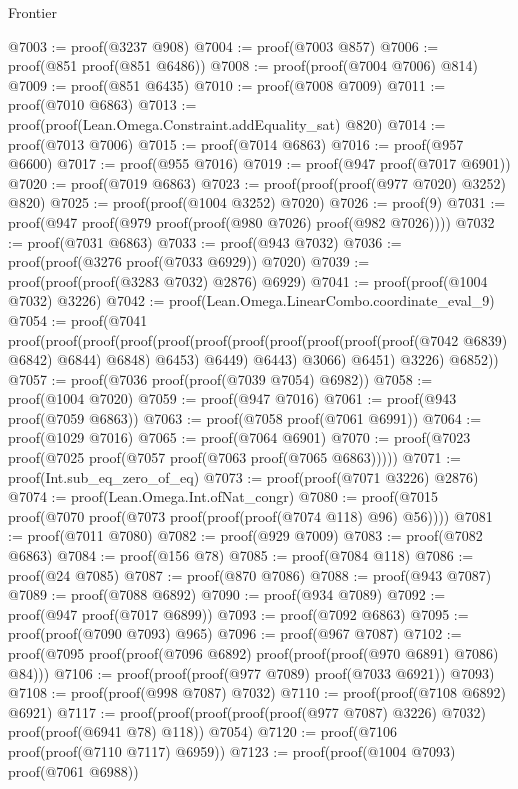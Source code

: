 \begin{lexlean}{Frontier}
\begin{coremodule}
@7003 := proof(@3237 @908)
@7004 := proof(@7003 @857)
@7006 := proof(@851 proof(@851 @6486))
@7008 := proof(proof(@7004 @7006) @814)
@7009 := proof(@851 @6435)
@7010 := proof(@7008 @7009)
@7011 := proof(@7010 @6863)
@7013 := proof(proof(Lean.Omega.Constraint.addEquality_sat) @820)
@7014 := proof(@7013 @7006)
@7015 := proof(@7014 @6863)
@7016 := proof(@957 @6600)
@7017 := proof(@955 @7016)
@7019 := proof(@947 proof(@7017 @6901))
@7020 := proof(@7019 @6863)
@7023 := proof(proof(proof(@977 @7020) @3252) @820)
@7025 := proof(proof(@1004 @3252) @7020)
@7026 := proof(9)
@7031 := proof(@947 proof(@979 proof(proof(@980 @7026) proof(@982 @7026))))
@7032 := proof(@7031 @6863)
@7033 := proof(@943 @7032)
@7036 := proof(proof(@3276 proof(@7033 @6929)) @7020)
@7039 := proof(proof(proof(@3283 @7032) @2876) @6929)
@7041 := proof(proof(@1004 @7032) @3226)
@7042 := proof(Lean.Omega.LinearCombo.coordinate_eval_9)
@7054 := proof(@7041
      proof(proof(proof(proof(proof(proof(proof(proof(proof(proof(proof(@7042 @6839) @6842) @6844)
                        @6848)
                      @6453)
                    @6449)
                  @6443)
                @3066)
              @6451)
            @3226)
          @6852))
@7057 := proof(@7036 proof(proof(@7039 @7054) @6982))
@7058 := proof(@1004 @7020)
@7059 := proof(@947 @7016)
@7061 := proof(@943 proof(@7059 @6863))
@7063 := proof(@7058 proof(@7061 @6991))
@7064 := proof(@1029 @7016)
@7065 := proof(@7064 @6901)
@7070 := proof(@7023 proof(@7025 proof(@7057 proof(@7063 proof(@7065 @6863)))))
@7071 := proof(Int.sub_eq_zero_of_eq)
@7073 := proof(proof(@7071 @3226) @2876)
@7074 := proof(Lean.Omega.Int.ofNat_congr)
@7080 := proof(@7015 proof(@7070 proof(@7073 proof(proof(proof(@7074 @118) @96) @56))))
@7081 := proof(@7011 @7080)
@7082 := proof(@929 @7009)
@7083 := proof(@7082 @6863)
@7084 := proof(@156 @78)
@7085 := proof(@7084 @118)
@7086 := proof(@24 @7085)
@7087 := proof(@870 @7086)
@7088 := proof(@943 @7087)
@7089 := proof(@7088 @6892)
@7090 := proof(@934 @7089)
@7092 := proof(@947 proof(@7017 @6899))
@7093 := proof(@7092 @6863)
@7095 := proof(proof(@7090 @7093) @965)
@7096 := proof(@967 @7087)
@7102 := proof(@7095 proof(proof(@7096 @6892) proof(proof(proof(@970 @6891) @7086) @84)))
@7106 := proof(proof(proof(@977 @7089) proof(@7033 @6921)) @7093)
@7108 := proof(proof(@998 @7087) @7032)
@7110 := proof(proof(@7108 @6892) @6921)
@7117 := proof(proof(proof(proof(proof(@977 @7087) @3226) @7032) proof(proof(@6941 @78) @118))
      @7054)
@7120 := proof(@7106 proof(proof(@7110 @7117) @6959))
@7123 := proof(proof(@1004 @7093) proof(@7061 @6988))

\end{coremodule}
\end{lexlean}
